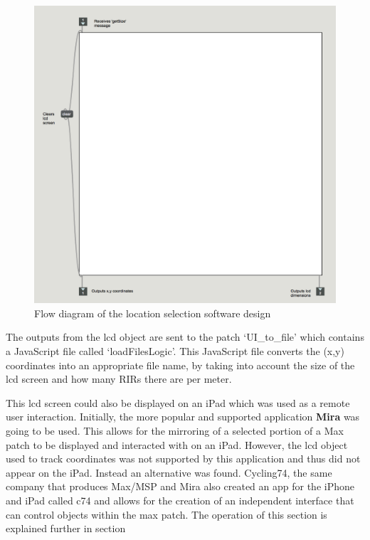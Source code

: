 \documentclass[../../main.tex]{subfiles}
\begin{document}
			\begin{figure}[H]
				\centerline{\includegraphics[scale = 0.4]{Sections/Implementation/Max/images/Max/lcd.png}}
				\caption{Flow diagram of the location selection software design}
				\label{lcd}
			\end{figure}

			The outputs from the lcd object are sent to the patch ‘UI\_to\_file’ which contains a JavaScript file called ‘loadFilesLogic’. This JavaScript file converts the (x,y) coordinates into an appropriate file name, by taking into account the size of the lcd screen and how many RIRs there are per meter.

			This lcd screen could also be displayed on an iPad which was used as a remote user interaction. Initially, the more popular and supported application \textbf{Mira} \cite{mira} was going to be used. This allows for the mirroring of a selected portion of a Max patch to be displayed and interacted with on an iPad. However, the lcd object used to track coordinates was not supported by this application and thus did not appear on the iPad. Instead an alternative was found. Cycling74, the same company that produces Max/MSP and Mira also created an app for the iPhone and iPad called c74 \cite{c74} and allows for the creation of an independent interface that can control objects within the max patch. The operation of this section is explained further in section 
\end{document}
